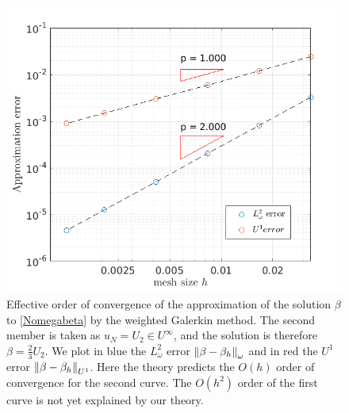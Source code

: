 \documentclass[a4paper]{article}
\begin{document}
\begin{figure}
	\centering
	\hspace{-1cm}\includegraphics[scale = 0.4]{figs/ordreCVNeu}
	\caption{Effective order of convergence of the approximation of the solution $\beta$ to \eqref{Nomegabeta} by the weighted Galerkin method. The second member is taken as $u_N = U_2 \in U^{\infty}$, and the solution is therefore $\beta = \frac{2}{3}U_2$. We plot in blue the $L^2_\omega$ error $\left\|\beta - \beta_h\right\|_{\omega}$ and in red the $U^1$ error $\left\|\beta - \beta_h\right\|_{U^1}$. Here the theory predicts the $O(h)$ order of convergence for the second curve. The $O(h^2)$ order of the first curve is not yet explained by our theory.} 
	\label{fig:errL2Neu}
\end{figure}
\end{document}

